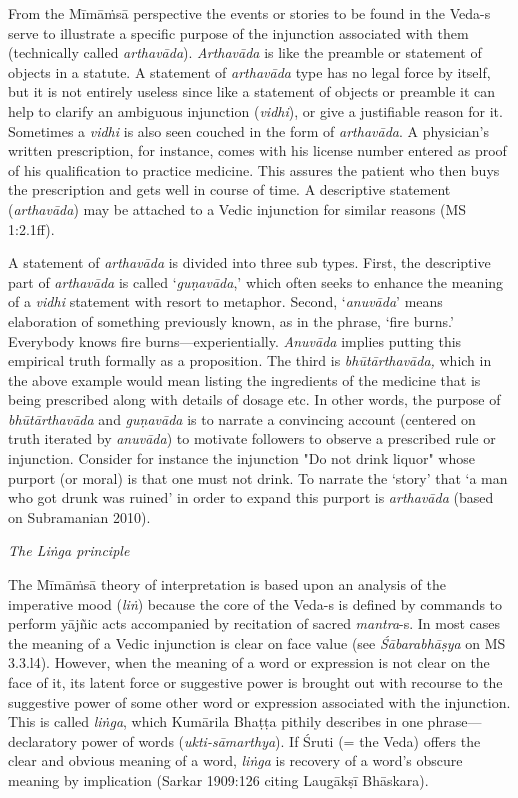 From the Mīmāṁsā perspective the events or stories to be found in the Veda-s serve to illustrate a specific purpose of the injunction associated with them (technically called \textit{arthavāda}). \textit{Arthavāda} is like the preamble or statement of objects in a statute. A statement of \textit{arthavāda }type has no legal force by itself, but it is not entirely useless since like a statement of objects or preamble it can help to clarify an ambiguous injunction (\textit{vidhi}), or give a justifiable reason for it. Sometimes a \textit{vidhi} is also seen couched in the form of \textit{arthavāda}. A physician’s written prescription, for instance, comes with his license number entered as proof of his qualification to practice medicine. This assures the patient who then buys the prescription and gets well in course of time. A descriptive statement (\textit{arthavāda}) may be attached to a Vedic injunction for similar reasons (MS 1:2.1ff). 

A statement of \textit{arthavāda} is divided into three sub types. First, the descriptive part of \textit{arthavāda} is called ‘\textit{guṇavāda},’ which often seeks to enhance the meaning of a \textit{vidhi }statement with resort to metaphor. Second, ‘\textit{anuvāda}’ means elaboration of something previously known, as in the phrase, ‘fire burns.’ Everybody knows fire burns—experientially. \textit{Anuvāda} implies putting this empirical truth formally as a proposition. The third is \textit{bhūtārthavāda, }which in the above example would mean listing the ingredients of the medicine that is being prescribed along with details of dosage etc. In other words, the purpose of \textit{bhūtārthavāda} and \textit{guṇavāda }is to narrate a convincing account (centered on truth iterated by \textit{anuvāda}) to motivate followers to observe a prescribed rule or injunction. Consider for instance the injunction "Do not drink liquor" whose purport (or moral) is that one must not drink. To narrate the ‘story’ that ‘a man who got drunk was ruined’ in order to expand this purport is \textit{arthavāda }(based on Subramanian 2010).

\textit{The Liṅga principle}

The Mīmāṁsā theory of interpretation is based upon an analysis of the imperative mood (\textit{liṅ}) because the core of the Veda-s is defined by commands to perform yājñic acts accompanied by recitation of sacred \textit{mantra}-s. In most cases the meaning of a Vedic injunction is clear on face value (see \textit{Śābarabhāṣya} on MS 3.3.l4). However, when the meaning of a word or expression is not clear on the face of it, its latent force or suggestive power is brought out with recourse to the suggestive power of some other word or expression associated with the injunction. This is called \textit{liṅga}, which Kumārila Bhaṭṭa pithily describes in one phrase—declaratory power of words (\textit{ukti-sāmarthya}). If Śruti (= the Veda) offers the clear and obvious meaning of a word, \textit{liṅga} is recovery of a word’s obscure meaning by implication (Sarkar 1909:126 citing Laugākṣī Bhāskara).

